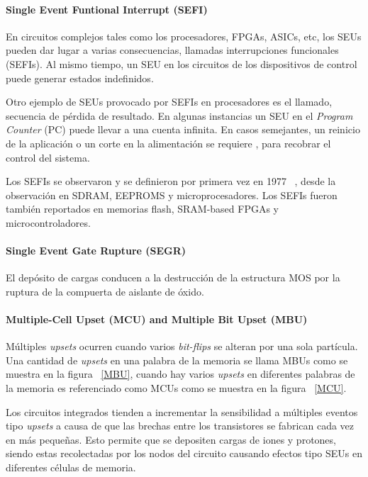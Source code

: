 \documentclass[a4paper,openright,12pt]{report}
\begin{document}
\paragraph{Single Event Funtional Interrupt (SEFI) } \hfill \break

En circuitos complejos tales como los procesadores, FPGAs, ASICs, etc, los SEUs pueden dar lugar a varias consecuencias, llamadas interrupciones funcionales (SEFIs). Al mismo tiempo, un SEU en los circuitos de los dispositivos de control puede generar estados indefinidos. 

Otro ejemplo de SEUs provocado por SEFIs en procesadores es el llamado, secuencia de pérdida de resultado. En algunas instancias un SEU en el \textit{Program Counter} (PC) puede llevar a una cuenta infinita. En casos semejantes, un reinicio de la aplicación o un corte en la alimentación se requiere , para recobrar el control del sistema.

Los SEFIs se observaron  y se definieron por primera vez en 1977  ~\cite{koga1997single}, desde la observación en SDRAM, EEPROMS y microprocesadores. Los SEFIs fueron también reportados en memorias flash, SRAM-based FPGAs y microcontroladores.
\pagebreak

\paragraph{Single Event Gate Rupture (SEGR) } \hfill \break

El depósito de cargas conducen a la destrucción de la estructura MOS por la ruptura de la compuerta de aislante de óxido.

\paragraph{Multiple-Cell Upset  (MCU)  and Multiple Bit Upset  (MBU)}  \hfill \break

Múltiples \textit{upsets} ocurren cuando varios \textit{bit-flips} se alteran por una sola partícula. Una cantidad de \textit{upsets} en una palabra de la memoria se llama MBUs como se muestra en la figura ~\ref{MBU}, cuando hay varios \textit{upsets} en diferentes palabras de la memoria es referenciado como MCUs como se muestra en la figura ~\ref{MCU}.

Los circuitos integrados tienden a incrementar la sensibilidad a múltiples eventos tipo \textit{upsets} a causa de que las brechas entre los transistores se fabrican cada vez en más pequeñas. Esto permite que se depositen cargas de iones y protones, siendo estas recolectadas por los nodos del circuito causando efectos tipo SEUs en diferentes células de memoria.
\end{document}
